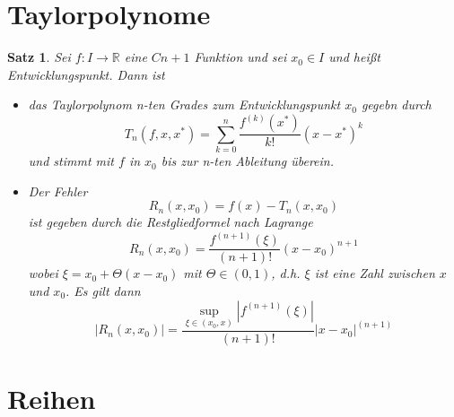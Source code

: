 \documentclass[12pt,a4paper]{report}%
\newtheorem{satz}{Satz}[section]
\numberwithin{equation}{section}
\newcommand{\R}{\mathbb{R}} %
\numberwithin{equation}{subsection}
\begin{document}
\section{Taylorpolynome}
  \begin{satz}
  Sei $f:I\rightarrow \R$ eine $C{n+1}$ Funktion und sei $x_0 \in I$ und heißt Entwicklungspunkt. Dann ist
  \begin{itemize}
    \item[a) ] das Taylorpolynom n-ten Grades zum Entwicklungspunkt $x_0$ gegebn durch
    \begin{equation}
    T_n(f, x, x^*) = \sum\limits_{k= 0}^n \frac{f^{(k)}(x^*)}{k!} (x-x^*)^k
    \end{equation}
    und stimmt mit $f$ in $x_0$ bis zur n-ten Ableitung überein.
    \item[b) ] Der Fehler 
    \begin{equation}
      R_n(x,x_0) = f(x) - T_n(x,x_0)
    \end{equation}
    ist gegeben durch die Restgliedformel nach Lagrange
    \begin{equation}
      R_n(x,x_0) = \frac{f^{(n+1)}(\xi)}{(n+1)!}(x-x_0)^{n+1}
    \end{equation}
    wobei $\xi = x_0 + \Theta (x-x_0)$ mit $\Theta \in (0,1)$, d.h. $\xi$ ist eine Zahl zwischen $x$ und $x_0$. Es gilt dann
    \begin{equation}
      \big|R_n(x,x_0)\big| = \frac{\sup\limits_{\xi \in (x_0,x)} \left|f^{(n+1)}(\xi)\right|}{(n+1)!}|x-x_0|^{(n+1)}
    \end{equation}
  \end{itemize}
  \end{satz}  
\newpage

\section{Reihen}
\end{document}
